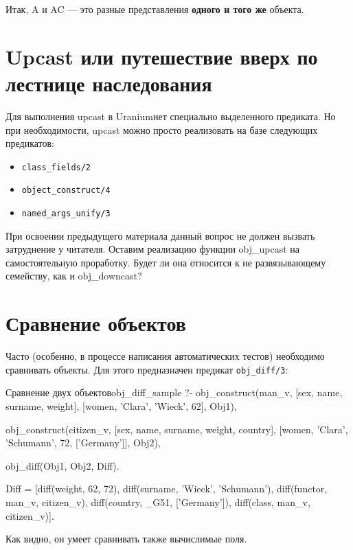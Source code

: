 \documentclass[a4paper]{book}
\def\ur{Uranium}
\begin{document}
Итак, A и AC --- это разные представления {\bf одного и того же}
объекта.

\section{Upcast или путешествие вверх по лестнице наследования}
\label{upcast}

Для выполнения upcast в \ur нет специально выделенного
предиката. Но при необходимости, upcast можно просто реализовать
на базе следующих предикатов:

\begin{itemize}
\item \verb|class_fields/2|
\item \verb|object_construct/4|
\item \verb|named_args_unify/3|
\end{itemize}


При освоении предыдущего материала данный вопрос не должен
вызвать затруднение у читателя. Оставим реализацию функции
obj_upcast на самостоятельную проработку. Будет ли она относится
к не развязывающему семейству, как и obj_downcast?

\section{Сравнение объектов}
\label{obj_diff}

Часто (особенно, в процессе написания автоматических тестов)
необходимо сравнивать объекты. Для этого предназначен предикат
\verb|obj_diff/3|:

\begin{example}{Сравнение двух объектов}{obj_diff_sample}
?- obj_construct(man_v, 
      [sex, name, surname, weight], 
      [women, 'Clara', 'Wieck', 62], Obj1), 
   
   obj_construct(citizen_v, 
      [sex, name, surname, weight, country], 
      [women, 'Clara', 'Schumann', 72, ['Germany']], Obj2), 

   obj_diff(Obj1, Obj2, Diff).

Diff = [diff(weight, 62, 72), diff(surname, 'Wieck', 'Schumann'), diff(functor, man_v, citizen_v), diff(country, _G51, ['Germany']), diff(class, man_v, citizen_v)].
\end{example}

Как видно, он умеет сравнивать также вычислимые поля.

\end{document}
